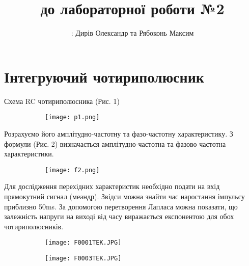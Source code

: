 \documentclass[a4paper,12pt]{article}
\begin{document}
\title{ до лабораторної роботи №2\linebreak }
\author{: Дирів Олександр та Рябоконь Максим}
\date{}
\maketitle
\newpage
{\Large\tableofcontents}
\newpage
\section{Інтегруючий чотириполюсник}
\quad Схема RC чотириполюсника (Рис. 1) 
\par\quad\begin{figure}[!h]
  \centering
 \begin{subfigure}[b]{0.6\linewidth}
    \texttt{[image: p1.png]}
  \end{subfigure}
  \caption{}
\end{figure}
\par\quad Розрахуємо його амплітудно-частотну та фазо-частотну характеристику. З формули (Рис. 2) визначається амплітудно-частотна та фазово частотна характеристики.  
\par\quad\begin{figure}[!h]
  \centering
 \begin{subfigure}[b]{0.6\linewidth}
    \texttt{[image: f2.png]}
  \end{subfigure}
  \caption{}
\end{figure}
\clearpage
\quad Для дослідження перехідних характеристик необхідно подати на вхід прямокутний сигнал (меандр). Звідси можна знайти час наростання імпульсу приблизно 50ms. За допомогою перетворення Лапласа можна показати, що залежність напруги на виході від часу виражається експонентою для обох чотириполюсників. 
\par\quad\begin{figure}[!h]
  \centering
 \begin{subfigure}[b]{1\linewidth}
    \texttt{[image: F0001TEK.JPG]}
  \end{subfigure}
  \caption{}
\end{figure}
\par\quad\begin{figure}[!h]
  \centering
 \begin{subfigure}[b]{1\linewidth}
    \texttt{[image: F0003TEK.JPG]}
  \end{subfigure}
  \caption{}
\end{figure}
\clearpage
\end{document}
